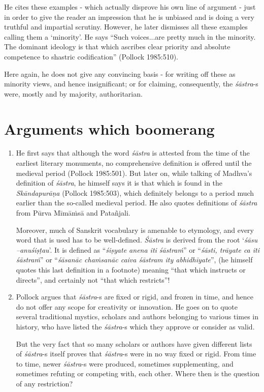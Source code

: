 \begin{enumerate}
He cites these examples - which actually disprove his own line of argument - just in order to give the reader an impression that he is unbiased and is doing a very truthful and impartial scrutiny. However, he later dismisses all these examples calling them a `minority'. He says ``Such voices...are pretty much in the minority. The dominant ideology is that which ascribes clear priority and absolute competence to shastric codification'' (Pollock 1985:510). 

Here again, he does not give any convincing basis - for writing off these as minority views, and hence insignificant; or for claiming, consequently, the {\it śāstra}-s were, mostly and by majority, authoritarian. 
\end{enumerate}

\section*{Arguments which boomerang}

\begin{enumerate}
\item He first says that although the word {\it śāstra} is attested from the time of the earliest literary monuments, no comprehensive definition is offered until the medieval period (Pollock 1985:501). But later on, while talking of Madhva's definition of {\it śāstra}, he himself says it is that which is found in the {\it Skāndapurāṇa} (Pollock 1985:503), which definitely belongs to a period much earlier than the so-called medieval period. He also quotes definitions of {\it śāstra} from Pūrva Mīmāṁsā and Patañjali. 

Moreover, much of Sanskrit vocabulary is amenable to  etymology, and every word that is used has to be well-defined. {\it Śāstra} is derived from the root `\textsl{śāsu --anuśiṣṭau}'. It is defined as ``\textsl{śiṣyate anena iti śāstraṁ}'' or ``\textsl{śāsti, trāyate ca iti śāstraṁ}'' or ``\textsl{śāsanāc chaṁsanāc caiva śāstram ity abhidhīyate}'', (he himself quotes this last definition in a footnote) meaning ``that which instructs or directs'', and certainly not ``that which restricts''!

\item Pollock argues that {\it śāstra}-s are fixed or rigid, and frozen in time, and hence do not offer any scope for creativity or innovation. He goes on to quote several traditional mystics, scholars and authors belonging to various times in history, who have listed the {\it śāstra}-s which they approve or consider as valid. 

But the very fact that so many scholars or authors have given different lists of {\it śāstra}-s itself proves that {\it śāstra}-s were in no way fixed or rigid. From time to time, newer {\it śāstra}-s were produced, sometimes supplementing, and sometimes refuting or competing with, each other. Where then is the question of any restriction?
\end{enumerate}

